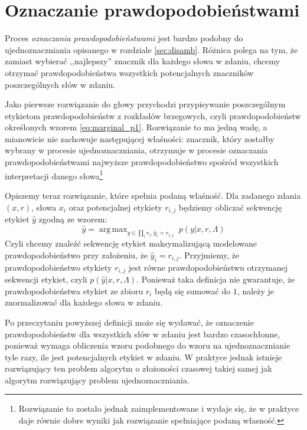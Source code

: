 \documentclass[a4paper,10]{article}
\DeclareMathOperator*{\argmax}{arg\,max}
\begin{document}
\section{Oznaczanie prawdopodobieństwami}\label{sec:tag_probs}

Proces \emph{oznaczania prawdopodobieństwami} jest bardzo podobny do
ujednoznaczniania opisanego w rozdziale \ref{sec:disamb}.
Różnica polega na tym, że zamiast wybierać ,,najlepszy'' znacznik
dla każdego słowa w zdaniu, chcemy otrzymać prawdopodobieństwa
wszystkich potencjalnych znaczników poszczególnych słów w zdaniu.

Jako pierwsze rozwiązanie do głowy przychodzi przypisywanie
poszczególnym etykietom prawdopodobieństw z rozkładów brzegowych,
czyli prawdopodobieństw określonych wzorem \ref{eq:marginal_p1}.
Rozwiązanie to ma jedną wadę, a mianowicie nie zachowuje następującej właśności:
znacznik, który zostałby wybrany w procesie ujednoznaczniania,
otrzymuje w procesie oznaczania prawdopodobieństwami najwyższe
prawdopodobieństwo spośród wszystkich interpretacji danego
słowa\footnote{Rozwiązanie to zostało jednak zaimplementowane i wydaje się,
że w praktyce daje równie dobre wyniki jak rozwiązanie spełniające
podaną własność.}

Opiszemy teraz rozwiązanie, które spełnia podaną właśność.
Dla zadanego zdania $(x, r)$, słowa $x_i$ oraz potencjalnej etykiety $r_{i, j}$
będziemy obliczać sekwencję etykiet $\hat y$ zgodną ze wzorem:
\begin{equation}\label{eq:argmax_p_cond}
\hat y = \argmax_{y \in \prod_i r_i, \hat y_i = r_{i, j}} \; p(y \vert x, r, \Lambda)
\end{equation}
Czyli chcemy znaleźć sekwencję etykiet maksymalizującą
modelowane prawdopodobieństwo przy założeniu, że $\hat y_i = r_{i, j}$.
Przyjmiemy, że prawdopodobieństwo etykiety $r_{i, j}$ jest
równe prawdopodobieństwu otrzymanej sekwencji etykiet, czyli
$p(\hat y \vert x, r, \Lambda)$.
Ponieważ taka definicja nie gwarantuje, że prawdopodobieństwa
etykiet ze zbioru $r_i$ będą się sumować do $1$, należy je
znormalizować dla każdego słowa w zdaniu.

Po przeczytaniu powyższej definicji może się wydawać, że
oznaczenie prawdopodobieństw dla wszystkich słów w zdaniu
jest bardzo czasochłonne, ponieważ wymaga obliczenia wzoru
podobnego do wzoru na ujednoznacznianie tyle razy, ile
jest potencjalnych etykiet w zdaniu. W praktyce jednak
istnieje rozwiązujący ten problem algorytm o złożoności
czasowej takiej samej jak algorytm rozwiązujący problem
ujednoznaczniania.
\end{document}
